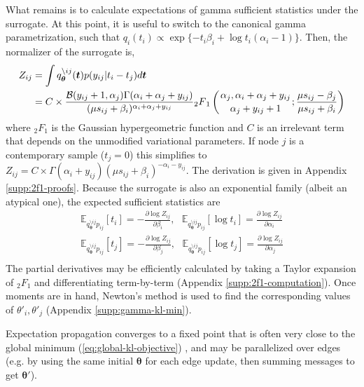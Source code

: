\documentclass{article}
\begin{document}
What remains is to calculate expectations of gamma sufficient statistics under the surrogate. 
At this point, it is useful to switch to the canonical gamma parametrization, 
such that $q_{i}(t_i) \propto \exp \{ -t_i \beta_i + \log t_i (\alpha_i - 1) \}$. 
Then, the normalizer of the surrogate is,
\[
\begin{aligned}
Z_{ij} & = \int q^{\setminus ij}_{\bm \theta}(\bm t) p(y_{ij} | t_i - t_j) d\bm t \\
& = C \times \frac{\mathcal{B}(y_{ij} + 1, \alpha_j) \Gamma(\alpha_i + \alpha_j + y_{ij})}{(\mu s_{ij} + \beta_i)^{\alpha_i + \alpha_j + y_{ij}}} {_2}F{_1}\left( {{\alpha_j,  \alpha_i + \alpha_j + y_{ij} } \atop {\alpha_j + y_{ij} + 1}}; \frac{\mu s_{ij} - \beta_j}{\mu s_{ij} + \beta_i} \right)
\end{aligned}
\]
where ${_2}F{_1}$ is the Gaussian hypergeometric function and $C$ is an irrelevant term that depends on the unmodified variational parameters. 
If node $j$ is a contemporary sample ($t_j = 0$) this simplifies to $Z_{ij} = C \times \Gamma(\alpha_i + y_{ij}) (\mu s_{ij} + \beta_i)^{-\alpha_i - y_{ij}}$. 
The derivation is given in Appendix \ref{supp:2f1-proofs}. 
Because the surrogate is also an exponential family (albeit an atypical one), the expected sufficient statistics are
\[
\begin{aligned}
\mathbb{E}_{q^{\setminus ij}_{\bm \theta} p_{ij}}[t_i] = -\frac{\partial \log Z_{ij}}{\partial \beta_i},~~~ \mathbb{E}_{q^{\setminus ij}_{\bm \theta} p_{ij}}[\log t_i] = \frac{\partial \log Z_{ij}}{\partial \alpha_i} \\
\mathbb{E}_{q^{\setminus ij}_{\bm \theta} p_{ij}}[t_j] = -\frac{\partial \log Z_{ij}}{\partial \beta_j},~~~ \mathbb{E}_{q^{\setminus ij}_{\bm \theta} p_{ij}}[\log t_j] = \frac{\partial \log Z_{ij}}{\partial \alpha_j} \\
\end{aligned}
\] 
The partial derivatives may be efficiently calculated by taking a Taylor expansion of ${_2}F{_1}$ and differentiating term-by-term (Appendix \ref{supp:2f1-computation}). 
Once moments are in hand, Newton's method is used to find the corresponding values of $\theta'_i, \theta'_j$ (Appendix \ref{supp:gamma-kl-min}).

Expectation propagation converges to a fixed point that is often very close to the global minimum (\ref{eq:global-kl-objective}) \cite{cunningham2014gaussian}, 
and may be parallelized over edges 
(e.g. by using the same initial $\bm \theta$ for each edge update, then summing messages to get $\bm \theta'$).
\end{document}
